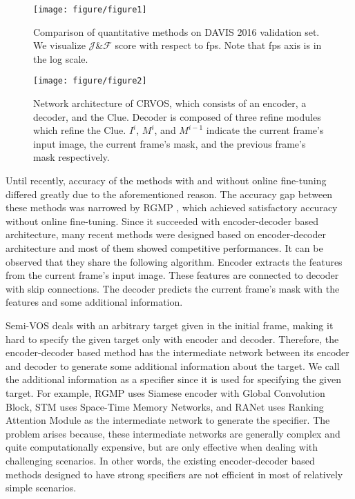 \documentclass{article}
\begin{document}
\begin{figure}[t]
	\centering
	\texttt{[image: figure/figure1]}
	\caption{Comparison of quantitative methods on DAVIS 2016 validation set. We visualize $\mathcal{J}$\&$\mathcal{F}$ score with respect to fps. Note that fps axis is in the log scale.}
	\label{figure1}
\end{figure}


\begin{figure*}[t]
	\centering
	\texttt{[image: figure/figure2]}
	\caption{Network architecture of CRVOS, which consists of an encoder, a decoder, and the Clue. Decoder is composed of three refine modules which refine the Clue. $I^i$, $M^i$, and $M^{i-1}$ indicate the current frame's input image, the current frame's mask, and the previous frame's mask respectively.}
	\label{figure2}
\end{figure*}



Until recently, accuracy of the methods with and without online fine-tuning differed greatly due to the aforementioned reason. The accuracy gap between these methods was narrowed by RGMP \cite{wug2018fast}, which achieved satisfactory accuracy without online fine-tuning. Since it succeeded with encoder-decoder based architecture, many recent methods \cite{johnander2019generative, lin2019agss, zeng2019dmm, oh2019video, wang2019ranet} were designed based on encoder-decoder architecture and most of them showed competitive performances. It can be observed that they share the following algorithm. Encoder extracts the features from the current frame's input image. These features are connected to decoder with skip connections. The decoder predicts the current frame's mask with the features and some additional information. 



Semi-VOS deals with an arbitrary target given in the initial frame, making it hard to specify the given target only with encoder and decoder. Therefore, the encoder-decoder based method has the intermediate network between its encoder and decoder to generate some additional information about the target. We call the additional information as a specifier since it is used for specifying the given target. For example, RGMP \cite{wug2018fast} uses Siamese encoder with Global Convolution Block, STM \cite{oh2019video} uses Space-Time Memory Networks, and RANet \cite{wang2019ranet} uses Ranking Attention Module as the intermediate network to generate the specifier. The problem arises because, these intermediate networks are generally complex and quite computationally expensive, but are only effective when dealing with challenging scenarios. In other words, the existing encoder-decoder based methods designed to have strong specifiers are not efficient in most of relatively simple scenarios.
\end{document}
